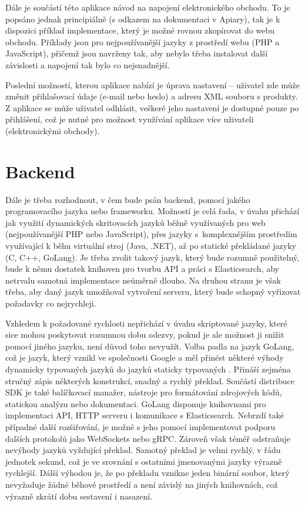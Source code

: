 \documentclass[FM,DP]{tulthesis}
\begin{document}
Dále je součástí této aplikace návod na napojení elektronického obchodu. To je popsáno jednak
principiálně (s odkazem na dokumentaci v Apiary), tak je k dispozici příklad implementace, 
který je možné rovnou zkopírovat do webu obchodu. Příklady jsou pro nejpoužívanější jazyky
z prostředí webu (PHP a JavaScript), přičemž jsou navrženy tak, aby nebylo třeba instalovat
další závislosti a napojení tak bylo co nejsnadnější.

Poslední možností, kterou aplikace nabízí je úprava nastavení -- uživatel zde může změnit
přihlašovací údaje (e-mail nebo heslo) a adresu XML souboru s produkty. Z aplikace se může 
uživatel odhlásit, veškeré jeho nastavení je dostupné pouze po přihlášení, což je nutné
pro možnost využívání aplikace více uživateli (elektronickými obchody).

\section{Backend}

Dále je třeba rozhodnout, v čem bude psán backend, pomocí jakého programovacího jazyka
nebo frameworku. Možností je celá řada, v úvahu přichází jak využití dynamických skritovacích 
jazyků běžně využívaných pro web (nejpoužívanější PHP nebo JavaScript), přes jazyky 
s~komplexnějším prostředím využívající k běhu virtuální stroj (Java, .NET), až po statické 
překládané jazyky (C, C++, GoLang). Je třeba zvolit takový jazyk, který bude rozumně použitelný, 
bude k němu dostatek knihoven pro tvorbu API a práci s Elasticsearch, aby netrvalu samotná
implementace neúměrně dlouho. Na druhou stranu je však třeba, aby daný jazyk umožňoval
vytvoření serveru, který bude schopný vyřizovat požadavky co nejrychleji.

Vzhledem k požadované rychlosti nepřichází v úvahu skriptované jazyky, které sice mohou
poskytovat rozumnou dobu odezvy, pokud je ale možnost ji snížit pomocí jiného jazyku, 
není důvod toho nevyužít. Volba padla na jazyk GoLang, což je jazyk, který vznikl 
ve společnosti Google a měl přinést některé výhody dynamicky typovaných jazyků do jazyků 
staticky typovaných \cite{go-in-action}. Přináší zejména stručný zápis některých konstrukcí, 
snadný a rychlý překlad. 
Součástí distribuce SDK je také balíčkovací manažer, nástroje pro formátování zdrojových kódů, 
statickou analýzu nebo dokumentaci.
GoLang disponuje knihovnami pro implementaci API, HTTP serveru i komunikace s Elasticsearch. Nebrzdí 
také případné další rozšiřování, je možné s jeho pomocí implementovat podporu dalších protokolů jako
WebSockets nebo gRPC. Zároveň však téměř odstraňuje nevýhody jazyků vyždující překlad.
Samotný překlad je velmi rychlý, v řádu jednotek sekund, což je ve srovnání s ostatními
jmenovanými jazyky výrazně rychlejší. Dálší výhodou je, že po překladu vznikne jeden
binární soubor, který nevyžaduje žádné běhové prostředí a není závislý na jiných knihovnách, 
což výrazně zkrátí dobu sestavení i nasazení.
\end{document}
